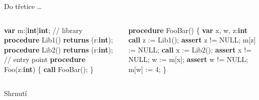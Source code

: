 \documentclass[11pt]{beamer}
\begin{document}
\begin{frame}[fragile]{Do třetice \ldots}
\begin{columns}

\begin{column}{0.5\textwidth}
\begin{semiverbatim}
\textbf{var} m:[\textbf{int}]\textbf{int};
\pause
// library
\textbf{procedure} Lib1()
  \textbf{returns} (r:\textbf{int});
\textbf{procedure} Lib2()
  \textbf{returns} (r:\textbf{int});
\pause
// entry point
\textbf{procedure} Foo(z:\textbf{int}) \{
  \textbf{call} FooBar();
\}
\end{semiverbatim}
\end{column}

\begin{column}{0.5\textwidth}
\begin{semiverbatim}
\pause
\textbf{procedure} FooBar() \{
  \textbf{var} x, w, z:\textbf{int}
  \textbf{call} z := Lib1();
  \textbf{assert} z != NULL;
  m[z] := NULL;
  \textbf{call} x := Lib2();
  \textbf{assert} x != NULL;
  w := m[x];
  \textbf{assert} w != NULL;
  m[w] := 4;
\}
\end{semiverbatim}
\end{column}

\end{columns}
\end{frame}

\begin{frame}{Shrnutí}

\end{frame}

\end{document}
